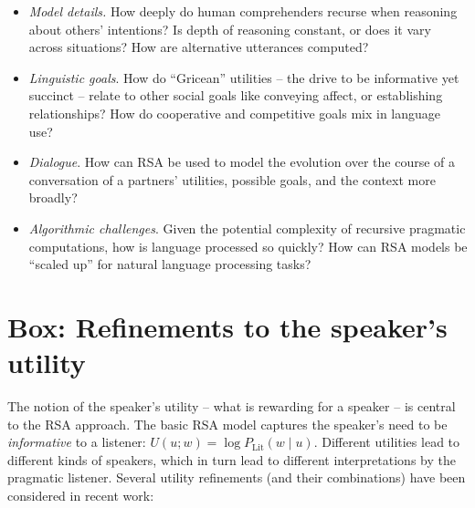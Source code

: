 \documentclass[]{elsarticle}
\begin{document}
\begin{itemize}
\item \emph{Model details.} How deeply do human comprehenders recurse when
  reasoning about others' intentions? Is depth of reasoning constant, or
  does it vary across situations? How are alternative utterances
  computed?

%
\item \emph{Linguistic goals}. How do ``Gricean'' utilities -- the drive to be informative yet succinct -- relate to other social goals like conveying affect, or establishing relationships? How do cooperative and competitive goals mix in language use?

\item \emph{Dialogue}. How can RSA be used to model the evolution over the course of a conversation of a partners' utilities, possible goals, and the context more broadly?


\item \emph{Algorithmic challenges}. Given the potential complexity of
recursive pragmatic computations, how is language processed so quickly? How can RSA models be ``scaled up'' for natural language
  processing tasks?
%

\end{itemize}

\section{Box: Refinements to the speaker's utility}\label{box-refinements-to-the-speakers-utility}

The notion of the speaker's utility -- what is rewarding for a speaker -- is central to the RSA approach. The basic RSA model captures the speaker's need to be \emph{informative} to a listener: $U(u; w) = \log P_{\text{Lit}}(w\mid u)$. Different utilities lead to different kinds of
speakers, which in turn lead to different interpretations by the pragmatic
listener. Several utility refinements (and their combinations) have been
considered in recent work:
\end{document}
